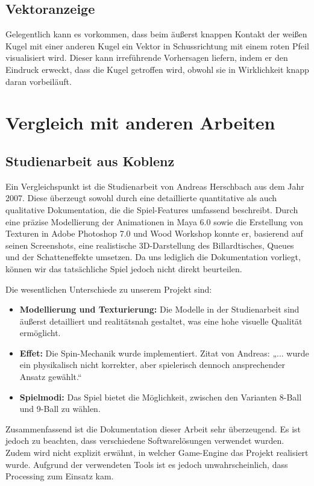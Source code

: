 \documentclass[a4paper,12pt]{article}
\begin{document}
\subsection{Vektoranzeige}  


Gelegentlich kann es vorkommen, dass beim äußerst knappen Kontakt der weißen Kugel mit einer anderen Kugel ein Vektor in Schussrichtung mit einem roten Pfeil visualisiert wird. Dieser kann irreführende Vorhersagen liefern, indem er den Eindruck erweckt, dass die Kugel getroffen wird, obwohl sie in Wirklichkeit knapp daran vorbeiläuft.  

\section{Vergleich mit anderen Arbeiten}
\subsection{Studienarbeit aus Koblenz}

Ein Vergleichspunkt ist die Studienarbeit von Andreas Herschbach aus dem Jahr 2007. \cite{Studienarbeit} Diese überzeugt sowohl durch eine detaillierte quantitative als auch qualitative Dokumentation, die die Spiel-Features umfassend beschreibt. Durch eine präzise Modellierung der Animationen in Maya 6.0 sowie die Erstellung von Texturen in Adobe Photoshop 7.0 und Wood Workshop konnte er, basierend auf seinen Screenshots, eine realistische 3D-Darstellung des Billardtisches, Queues und der Schatteneffekte umsetzen. Da uns lediglich die Dokumentation vorliegt, können wir das tatsächliche Spiel jedoch nicht direkt beurteilen.  

Die wesentlichen Unterschiede zu unserem Projekt sind:  

\begin{itemize}
	\item \textbf{Modellierung und Texturierung:} Die Modelle in der Studienarbeit sind äußerst detailliert und realitätsnah gestaltet, was eine hohe visuelle Qualität ermöglicht.
	\item \textbf{Effet:} Die Spin-Mechanik wurde implementiert. Zitat von Andreas: „... wurde ein physikalisch nicht korrekter, aber spielerisch dennoch ansprechender Ansatz gewählt.“ \cite{Studienarbeit}
	\item \textbf{Spielmodi:} Das Spiel bietet die Möglichkeit, zwischen den Varianten 8-Ball und 9-Ball zu wählen.
\end{itemize}

Zusammenfassend ist die Dokumentation dieser Arbeit sehr überzeugend. Es ist jedoch zu beachten, dass verschiedene Softwarelösungen verwendet wurden. Zudem wird nicht explizit erwähnt, in welcher Game-Engine das Projekt realisiert wurde. Aufgrund der verwendeten Tools ist es jedoch unwahrscheinlich, dass Processing zum Einsatz kam.  
\end{document}

